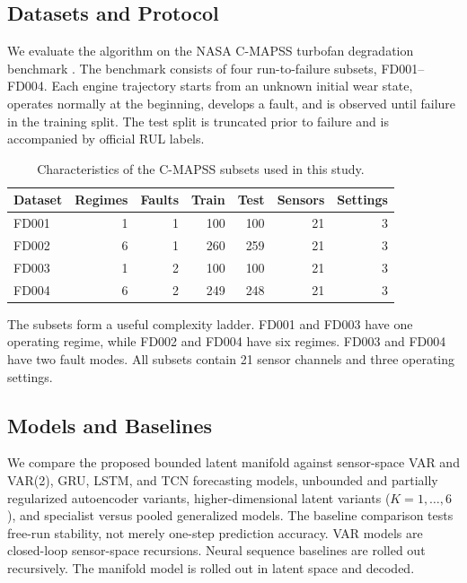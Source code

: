 \documentclass[a4paper,fleqn]{cas-sc}
\newcommand{\tablefont}{\small}
\newcommand{\tighttables}{%
  \setlength{\tabcolsep}{4.5pt}%
  \renewcommand{\arraystretch}{1.08}%
}
\begin{document}
\subsection{Datasets and Protocol}

We evaluate the algorithm on the NASA C-MAPSS turbofan degradation benchmark
\citep{nasa_cmapss,saxena2008turbofan,saxena2008damage}. The benchmark consists of four
run-to-failure subsets, FD001--FD004. Each engine trajectory starts from an
unknown initial wear state, operates normally at the beginning, develops a
fault, and is observed until failure in the training split. The test split is
truncated prior to failure and is accompanied by official RUL labels.

\begin{table}[t]
\centering
\caption{Characteristics of the C-MAPSS subsets used in this study.}
\label{tab:dataset_protocol}
\tablefont
\tighttables
\begin{tabular}{@{}lrrrrrr@{}}
\toprule
Dataset & Regimes & Faults & Train & Test & Sensors & Settings \\
\midrule
FD001 & 1 & 1 & 100 & 100 & 21 & 3 \\
FD002 & 6 & 1 & 260 & 259 & 21 & 3 \\
FD003 & 1 & 2 & 100 & 100 & 21 & 3 \\
FD004 & 6 & 2 & 249 & 248 & 21 & 3 \\
\bottomrule
\end{tabular}
\end{table}

The subsets form a useful complexity ladder. FD001 and FD003 have one
operating regime, while FD002 and FD004 have six regimes. FD003 and FD004 have
two fault modes. All subsets contain 21 sensor channels and three operating
settings.

\subsection{Models and Baselines}

We compare the proposed bounded latent manifold against sensor-space VAR and
VAR(2), GRU, LSTM, and TCN forecasting models, unbounded and partially
regularized autoencoder variants, higher-dimensional latent variants
($K=1,\ldots,6$), and specialist versus pooled generalized models. The baseline
comparison tests free-run stability, not merely one-step prediction accuracy.
VAR models are closed-loop sensor-space recursions. Neural sequence baselines
are rolled out recursively. The manifold model is rolled out in latent space
and decoded.
\end{document}
